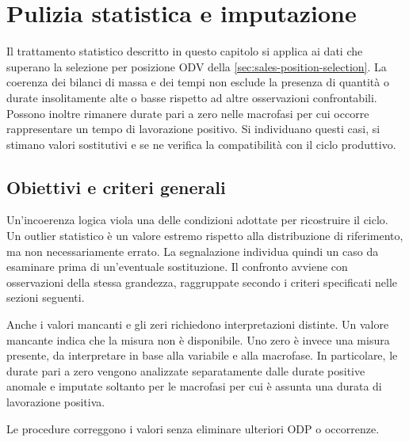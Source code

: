 \chapter{Pulizia statistica e imputazione}
\label{sec:statistical-cleaning-and-imputation}

Il trattamento statistico descritto in questo capitolo si applica ai dati che superano la selezione per posizione ODV della \cref{sec:sales-position-selection}. La coerenza dei bilanci di massa e dei tempi non esclude la presenza di quantità o durate insolitamente alte o basse rispetto ad altre osservazioni confrontabili. Possono inoltre rimanere durate pari a zero nelle macrofasi per cui occorre rappresentare un tempo di lavorazione positivo. Si individuano questi casi, si stimano valori sostitutivi e se ne verifica la compatibilità con il ciclo produttivo.

\section{Obiettivi e criteri generali}
\label{sec:statistical-treatment-principles}

Un'incoerenza logica viola una delle condizioni adottate per ricostruire il ciclo. Un outlier statistico è un valore estremo rispetto alla distribuzione di riferimento, ma non necessariamente errato. La segnalazione individua quindi un caso da esaminare prima di un'eventuale sostituzione. Il confronto avviene con osservazioni della stessa grandezza, raggruppate secondo i criteri specificati nelle sezioni seguenti.

Anche i valori mancanti e gli zeri richiedono interpretazioni distinte. Un valore mancante indica che la misura non è disponibile. Uno zero è invece una misura presente, da interpretare in base alla variabile e alla macrofase. In particolare, le durate pari a zero vengono analizzate separatamente dalle durate positive anomale e imputate soltanto per le macrofasi per cui è assunta una durata di lavorazione positiva.

Le procedure correggono i valori senza eliminare ulteriori ODP o occorrenze.

\clearpage
